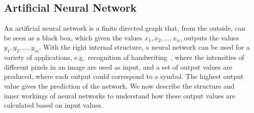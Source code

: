 \subsection{Artificial Neural Network}
An artificial neural network is a finite directed graph that, from the outside, can be seen as a black box, which given the values $x_1, x_2, \dots, x_n$, outputs the values $y_1, y_2, \dots, y_m$. With the right internal structure, a neural network can be used for a variety of applications, e.g.\ recognition of handwriting~\cite{Widrow:1994:NNA:175247.175257}, where the intensities of different pixels in an image are used as input, and a set of output values are produced, where each output could correspond to a symbol. The highest output value gives the prediction of the network. We now describe the structure and inner workings of neural networks to understand how these output values are calculated based on input values.

